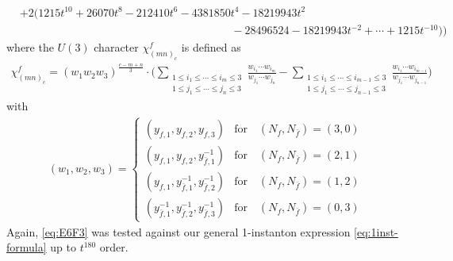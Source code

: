 \documentclass[letterpaper, 11pt]{article}
\newcommand{\nn}{\nonumber}
\begin{document}
{\begin{align}
&+2(1215 t^{10}+26070 t^8-212410 t^6-4381850 t^4-18219943 t^2\nn\\
&\hspace{8cm}-28496524-18219943 t^{-2}+\cdots+1215t^{-10})\Big)\nn
\end{align}
where the $U(3)$ character $\chi^f_{(mn)_c}$ is defined as
  \begin{align}
    \chi^f_{(mn)_c} =
      (w_1 w_2w_3)^{\frac{c-m+n}{3}} \cdot\bigg( \sum_{\substack{1\leq i_1\leq\cdots\leq i_m\leq3\\1\leq j_1\leq\cdots\leq j_n\leq 3}}\frac{w_{i_1}\cdots w_{i_m}}{w_{j_1}\cdots w_{j_n}}-\sum_{\substack{1\leq i_1\leq\cdots\leq i_{m-1}\leq3\\1\leq j_1\leq\cdots\leq j_{n-1}\leq 3}}\frac{w_{i_1}\cdots w_{i_{m-1}}}{w_{j_1}\cdots w_{j_{n-1}}}\bigg)
  \end{align}
  with
  \begin{align}
  (w_1,w_2,w_3)=
  \begin{cases}
  (y_{f,1},y_{f,2},y_{f,3}) & \text{for}\quad (N_f, N_{\bar{f}})=(3,0)\\
  (y_{f,1},y_{f,2},y_{\bar{f},1}^{-1}) & \text{for}\quad (N_f, N_{\bar{f}})=(2,1)\\
  (y_{f,1},y_{\bar{f},1}^{-1},y_{\bar{f},2}^{-1}) & \text{for}\quad (N_f, N_{\bar{f}})=(1,2)\\
  (y_{\bar{f},1}^{-1},y_{\bar{f},2}^{-1},y_{\bar{f},3}^{-1}) & \text{for}\quad (N_f, N_{\bar{f}})=(0,3)
  \end{cases}
  \end{align}
  Again, \eqref{eq:E6F3} was tested against our general 1-instanton expression \eqref{eq:1inst-formula} up to $t^{180}$ order.

  

}
\end{document}
